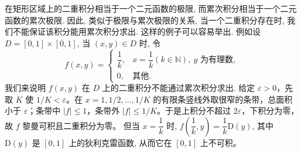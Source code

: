 \documentclass[12pt,fontset=fandol]{ctexart}
\begin{document}
\noindent{}\quad 在矩形区域上的二重积分相当于一个二元函数的极限, 而累次积分相当于一个二元函数的累次极限. 因此, 类似于极限与累次极限的关系, 当一个二重积分存在时, 我们不能保证该积分能用累次积分求出. 这样的例子可以容易举出. 例如设 $D=[0,1]\times[0,1]$, 当 $(x,y)\in D$ 时, 令
\[
  f(x,y)=
  \begin{cases}
    \dfrac1k, & x=\dfrac1k(k\in\mathbb N),\ y\text{ 为有理数},\\
    0, & \text{其他}.
  \end{cases}
\]
我们来说明 $f(x,y)$ 在 $D$ 上的二重积分不能通过累次积分求出. 给定 $\varepsilon>0$，先取 $K$ 使 $1/K<\varepsilon$。在 $x=1,1/2,\ldots,1/K$ 的有限条竖线外取很窄的条带，总面积小于 $\varepsilon$；条带中 $|f|\le1$，条带外 $|f|\le1/K$。于是上积分不超过 $2\varepsilon$，下积分为零，故 $f$ 黎曼可积且二重积分为零。 但当 $x=\dfrac1k$ 时, $f\left(\dfrac1k,y\right)=\dfrac1k\mathrm D(y)$, 其中 $\mathrm D(y)$ 是 $[0,1]$ 上的狄利克雷函数, 从而它在 $[0,1]$ 上不可积。
\end{document}
